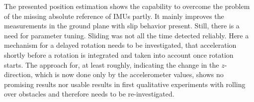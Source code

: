\documentclass[letterpaper, 10 pt, conference]{ieeeconf}  %
\begin{document}
The presented position estimation shows the capability to overcome the problem of the missing absolute reference of IMUs partly.
It mainly improves the measurements in the ground plane with slip behavior present.
Still, there is a need for parameter tuning. 
Sliding was not all the time detected reliably.
Here a mechanism for a delayed rotation needs to be investigated, that acceleration shortly before a rotation is integrated and taken into account once rotation starts.
The approach for, at least roughly, indicating the change in the $z$-direction, which is now done only by the accelerometer values, shows no promising results nor usable results in first qualitative experiments with rolling over obstacles and therefore needs to be re-investigated.




\addtolength{\textheight}{-12cm}   %



















\end{document}
